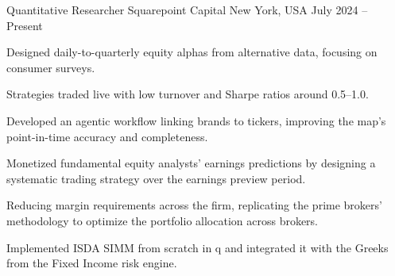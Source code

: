 
\begin{cventries}
	\cventry
	{Quantitative Researcher} %
	{Squarepoint Capital} %
	{New York, USA} %
	{July 2024 – Present} %
	{
		\begin{cvitems}
			\item Designed daily-to-quarterly equity alphas from alternative data, focusing on consumer surveys.
			\item Strategies traded live with low turnover and Sharpe ratios around 0.5–1.0.
			\item Developed an agentic workflow linking brands to tickers, improving the map's point-in-time accuracy and completeness.
			\item Monetized fundamental equity analysts' earnings predictions by designing a systematic trading strategy over the earnings preview period.
		\end{cvitems}
		\begin{cvitems}
			\item Reducing margin requirements across the firm, replicating the prime brokers' methodology to optimize the portfolio allocation across brokers.
			\item Implemented ISDA SIMM from scratch in q and integrated it with the Greeks from the Fixed Income risk engine.
		\end{cvitems}
	}
\end{cventries}
